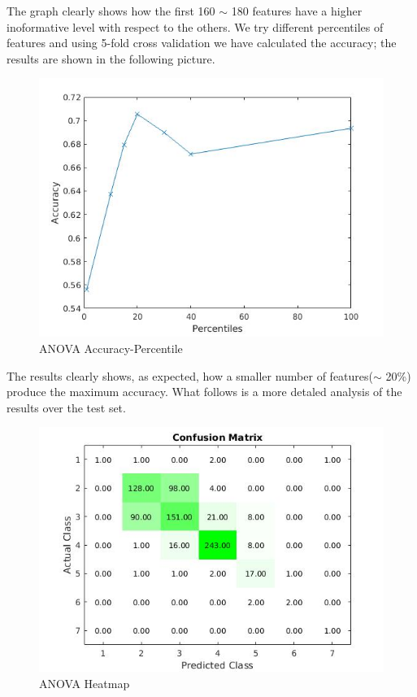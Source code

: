 \documentclass[a4paper,10pt]{article}
\begin{document}
      \noindent The graph clearly shows how the first 160 $\sim$ 180 features have a higher inoformative level with respect to the others.\newline
      We try different percentiles of features and using 5-fold cross validation we have calculated the accuracy; the results are shown in the following picture.
      \begin{figure}[H]
	\centering
	\includegraphics[scale=0.5]{anova-acc.jpg}
	\caption{ANOVA Accuracy-Percentile}
      \end{figure}
      \noindent The results clearly shows, as expected, how a smaller number of features($\sim$ 20\%) produce the maximum accuracy. \newline
      What follows is a more detaled analysis of the results over the test set.
      \begin{figure}[H]
	\centering
	\includegraphics[scale=0.5]{anova-heat.jpg}
	\caption{ANOVA Heatmap}
      \end{figure}
\end{document}
